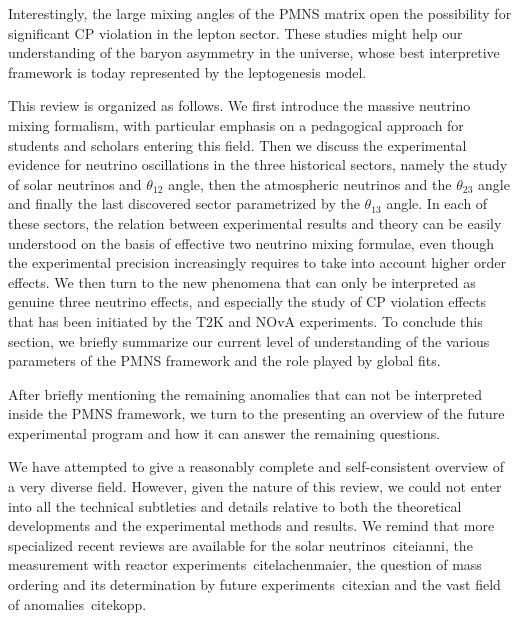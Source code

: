 Interestingly, the large mixing angles of the PMNS matrix open the possibility for significant CP violation in the lepton sector. These studies might help our understanding of the baryon asymmetry in the universe, whose best interpretive framework is today represented by the leptogenesis model.
 
This review is organized as follows. We first introduce the massive neutrino mixing formalism, with particular emphasis on a pedagogical approach for students and scholars entering this field. Then we discuss the experimental evidence for neutrino oscillations in the three historical sectors, namely the study of solar neutrinos and $\theta_{12}$ angle, then the atmospheric neutrinos and the $\theta_{23}$ angle and finally the last discovered sector parametrized by the $\theta_{13}$ angle. In each of these sectors, the relation between experimental results and theory can be easily understood on the basis of effective two neutrino mixing formulae, even though the experimental precision increasingly requires to take into account higher order effects. We then turn to the new phenomena that can only be interpreted as genuine three neutrino effects, and especially the study of CP violation effects that has been initiated by the T2K and NOvA experiments. To conclude this section, we briefly summarize our current level of understanding of the various parameters of the PMNS framework and the role played by global fits.

After briefly mentioning the remaining anomalies that can not be interpreted inside the PMNS framework, we turn to the presenting an overview of the future experimental program and how it can answer the remaining questions. 

We have attempted to give a reasonably complete and self-consistent overview of a very diverse field. However, given the nature of this review, we could not enter into all the technical subtleties and details relative to both the theoretical developments and the experimental methods and results. We remind that more specialized recent reviews are available for the solar neutrinos~cite{ianni}, the \thint measurement with reactor experiments~cite{lachenmaier}, the question of mass ordering and its determination by future experiments~cite{xian} and the vast field of anomalies~cite{kopp}.
